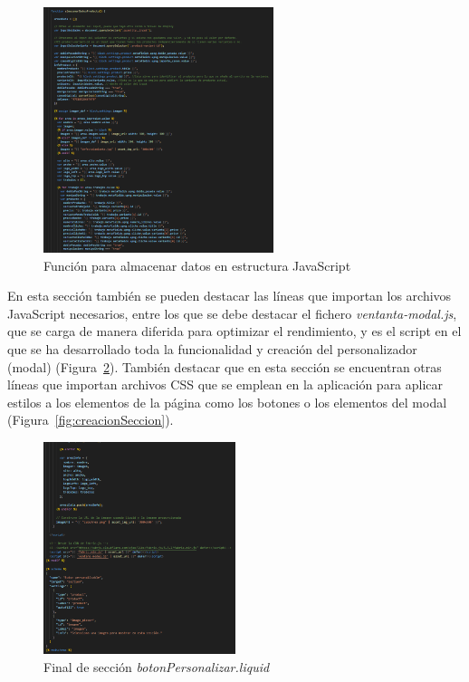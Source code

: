 \documentclass[11pt]{article}
\begin{document}
\begin{figure}[H]
    \centering
    \includegraphics[width=0.6\textwidth]{imagenesUS3-section/funcionAlmacenarDatosProductos.png}
    \caption{\label{fig:cargardatos} Función para almacenar datos en estructura JavaScript}
    \vspace{\fill}
\end{figure}

En esta sección también se pueden destacar las líneas que importan los archivos JavaScript necesarios, entre los que se debe destacar
el fichero \textit{ventanta-modal.js}, que se carga de manera diferida para optimizar el rendimiento, y es el script en el que se ha desarrollado toda la funcionalidad y creación del
personalizador (modal) (Figura~\ref{fig:finalSeccion}). También destacar que en esta sección se encuentran otras líneas que importan archivos CSS que se emplean en la aplicación para aplicar estilos 
a los elementos de la página como los botones o los elementos del modal (Figura~\ref{fig:creacionSeccion}).

\begin{figure}[H]
    \centering
    \includegraphics[width=0.5\textwidth]{imagenesUS3-section/finalSeccion.png}
    \caption{\label{fig:finalSeccion} Final de sección \textit{botonPersonalizar.liquid}}
    \vspace{\fill}
\end{figure}
\end{document}
